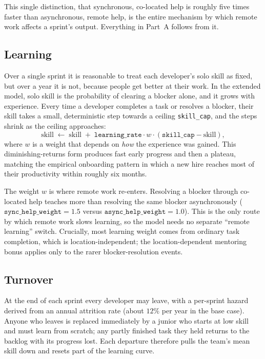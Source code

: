 \documentclass[11pt,a4paper]{article}
\begin{document}
This single distinction, that synchronous, co-located help is roughly five times faster than
asynchronous, remote help, is the entire mechanism by which remote work affects a sprint's output.
Everything in Part~A follows from it.

\subsection{Learning}

Over a single sprint it is reasonable to treat each developer's solo skill as fixed, but over a year
it is not, because people get better at their work. In the extended model, solo skill is the
probability of clearing a blocker alone, and it grows with experience. Every time a developer
completes a task or resolves a blocker, their skill takes a small, deterministic step towards a
ceiling \texttt{skill\_cap}, and the steps shrink as the ceiling approaches:
\[
\text{skill} \;\leftarrow\; \text{skill} \;+\; \texttt{learning\_rate}\cdot w \cdot
(\texttt{skill\_cap} - \text{skill}),
\]
where $w$ is a weight that depends on \emph{how} the experience was gained. This diminishing-returns
form produces fast early progress and then a plateau, matching the empirical onboarding pattern in
which a new hire reaches most of their productivity within roughly six months.

The weight $w$ is where remote work re-enters. Resolving a blocker through co-located help teaches
more than resolving the same blocker asynchronously ($\texttt{sync\_help\_weight}=1.5$ versus
$\texttt{async\_help\_weight}=1.0$). This is the only route by which remote work slows learning, so
the model needs no separate ``remote learning'' switch. Crucially, most learning weight comes from
ordinary task completion, which is location-independent; the location-dependent mentoring bonus
applies only to the rarer blocker-resolution events.

\subsection{Turnover}

At the end of each sprint every developer may leave, with a per-sprint hazard derived from an annual
attrition rate (about $12\%$ per year in the base case). Anyone who leaves is replaced immediately by
a junior who starts at low skill and must learn from scratch; any partly finished task they held
returns to the backlog with its progress lost. Each departure therefore pulls the team's mean skill
down and resets part of the learning curve.
\end{document}
